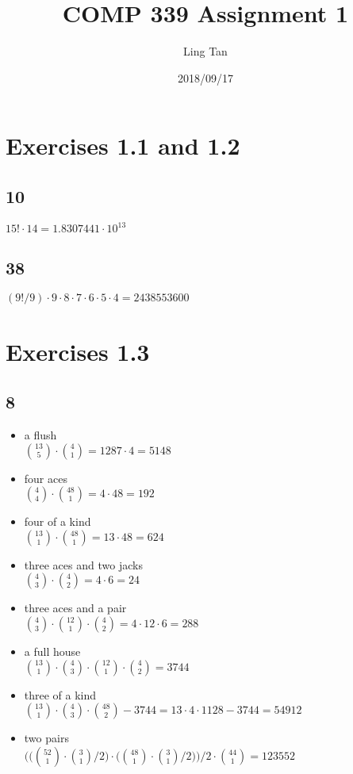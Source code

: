 \documentclass[a4paper]{article}
\title{COMP 339 Assignment 1}
\author{Ling Tan}
\date{2018/09/17}
\begin{document}
\maketitle

\section{Exercises 1.1 and 1.2}
\subsection{10}
$15! \cdot 14 = 1.8307441\cdot10^{13}$
\subsection{38}
$(9!/9) \cdot 9 \cdot 8 \cdot 7 \cdot 6 \cdot 5 \cdot 4 = 2438553600 $

\section{Exercises 1.3}
\subsection{8}
    \begin{itemize}
      \item a flush\\
      $ \binom{13}{5}\cdot\binom{4}{1}=1287\cdot 4=5148 $
      \item four aces\\
      $ \binom{4}{4}\cdot\binom{48}{1}=4\cdot 48=192$
      \item four of a kind\\
      $\binom{13}{1}\cdot\binom{48}{1}=13\cdot 48=624$
      \item three aces and two jacks\\
      $ \binom{4}{3}\cdot\binom{4}{2}=4\cdot6=24$
      \item three aces and a pair\\
      $\binom{4}{3}\cdot\binom{12}{1}\cdot\binom{4}{2}=4\cdot12\cdot6=288$
      \item a full house\\
      $\binom{13}{1}\cdot\binom{4}{3}\cdot\binom{12}{1}\cdot\binom{4}{2}=3744$
      \item three of a kind\\
      $\binom{13}{1}\cdot\binom{4}{3}\cdot\binom{48}{2}-3744=13\cdot4\cdot1128-3744=54912 $
      \item two pairs\\
      $\bigg(\Big(\binom{52}{1}\cdot\binom{3}{1}/2\Big)\cdot\Big(\binom{48}{1}\cdot\binom{3}{1}/2\Big)\bigg)/2\cdot\binom{44}{1}=123552$
    \end{itemize}
\end{document}
